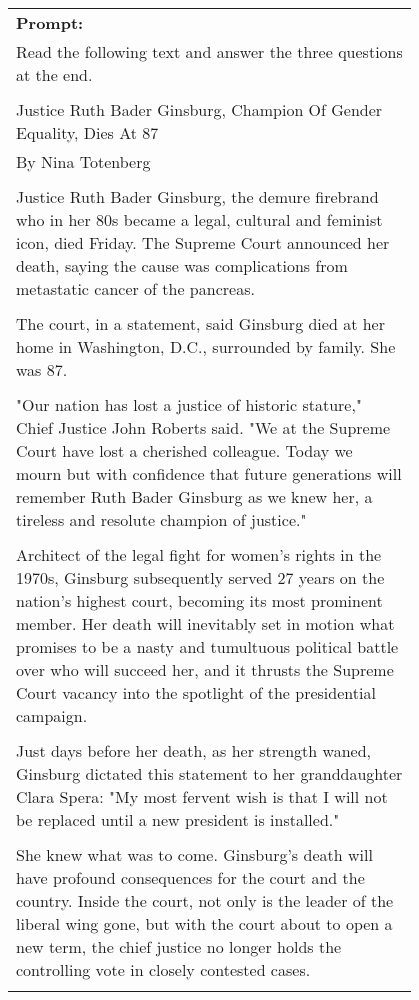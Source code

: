 \begin{figure}[hp]
    \centering
    \small
    \begin{tabular}{p{0.95\linewidth}}
    \toprule 
        \textbf{Prompt:}   \\
       Read the following text and answer the three questions at the end.\\\\
Justice Ruth Bader Ginsburg, Champion Of Gender Equality, Dies At 87\\
By Nina Totenberg\\\\
Justice Ruth Bader Ginsburg, the demure firebrand who in her 80s became a legal, cultural and feminist icon, died Friday. The Supreme Court announced her death, saying the cause was complications from metastatic cancer of the pancreas.\\\\
The court, in a statement, said Ginsburg died at her home in Washington, D.C., surrounded by family. She was 87.\\\\
"Our nation has lost a justice of historic stature," Chief Justice John Roberts said. "We at the Supreme Court have lost a cherished colleague. Today we mourn but with confidence that future generations will remember Ruth Bader Ginsburg as we knew her, a tireless and resolute champion of justice."\\\\
Architect of the legal fight for women's rights in the 1970s, Ginsburg subsequently served 27 years on the nation's highest court, becoming its most prominent member. Her death will inevitably set in motion what promises to be a nasty and tumultuous political battle over who will succeed her, and it thrusts the Supreme Court vacancy into the spotlight of the presidential campaign.\\\\
Just days before her death, as her strength waned, Ginsburg dictated this statement to her granddaughter Clara Spera: "My most fervent wish is that I will not be replaced until a new president is installed."\\\\
She knew what was to come. Ginsburg's death will have profound consequences for the court and the country. Inside the court, not only is the leader of the liberal wing gone, but with the court about to open a new term, the chief justice no longer holds the controlling vote in closely contested cases.\\\\

\end{tabular}
\end{figure}
